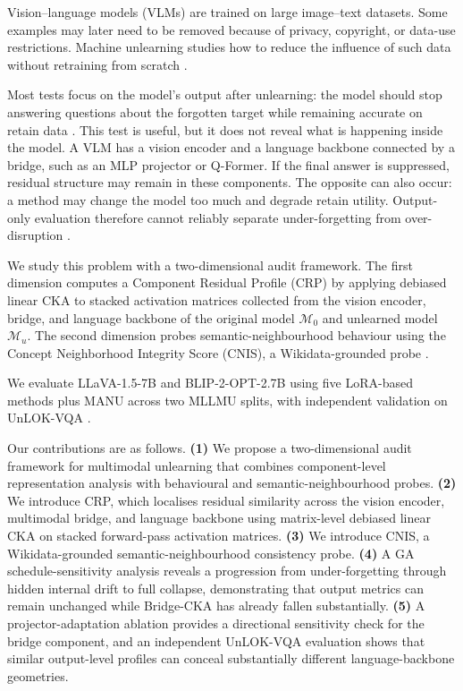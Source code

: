 \documentclass[letterpaper]{article}
\begin{document}
Vision--language models (VLMs) are trained on large image--text datasets.
Some examples may later need to be removed because of privacy, copyright,
or data-use restrictions. Machine unlearning studies how to reduce the
influence of such data without retraining from scratch
\citep{bourtoule2021machine}.

Most tests focus on the model's output after unlearning: the model should
stop answering questions about the forgotten target while remaining accurate
on retain data \citep{liu2024mllmu,dontsov2024clear,ma2024fiubench}. This
test is useful, but it does not reveal what is happening inside the model. A
VLM has a vision encoder and a language backbone connected by a bridge, such
as an MLP projector or Q-Former. If the final answer is suppressed, residual
structure may remain in these components. The opposite can also occur: a
method may change the model too much and degrade retain utility. Output-only
evaluation therefore cannot reliably separate under-forgetting from
over-disruption \citep{liang2023helm}.

We study this problem with a two-dimensional audit framework. The first
dimension computes a Component Residual Profile (CRP) by applying debiased
linear CKA \citep{kornblith2019cka,nguyen2021dkcka} to stacked activation
matrices collected from the vision encoder, bridge, and language backbone of
the original model $\mathcal{M}_0$ and unlearned model $\mathcal{M}_u$. The
second dimension probes semantic-neighbourhood behaviour using the Concept
Neighborhood Integrity Score (CNIS), a Wikidata-grounded probe
\citep{vrandevcic2014wikidata}.

We evaluate LLaVA-1.5-7B \citep{liu2023llava} and BLIP-2-OPT-2.7B
\citep{li2023blip2} using five LoRA-based methods plus MANU across two MLLMU
splits, with independent validation on UnLOK-VQA \citep{patil2025unlok}.

Our contributions are as follows.
\textbf{(1)} We propose a two-dimensional audit framework for multimodal
unlearning that combines component-level representation analysis with
behavioural and semantic-neighbourhood probes.
\textbf{(2)} We introduce CRP, which localises residual similarity across the
vision encoder, multimodal bridge, and language backbone using matrix-level
debiased linear CKA on stacked forward-pass activation matrices.
\textbf{(3)} We introduce CNIS, a Wikidata-grounded
semantic-neighbourhood consistency probe.
\textbf{(4)} A GA schedule-sensitivity analysis reveals a progression from
under-forgetting through hidden internal drift to full collapse, demonstrating
that output metrics can remain unchanged while Bridge-CKA has already fallen
substantially.
\textbf{(5)} A projector-adaptation ablation provides a directional sensitivity
check for the bridge component, and an independent UnLOK-VQA evaluation shows
that similar output-level profiles can conceal substantially different
language-backbone geometries.
\end{document}
